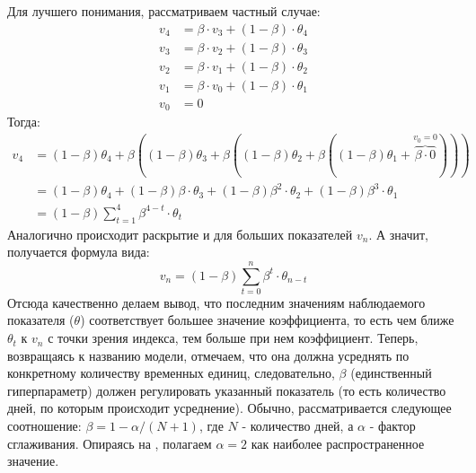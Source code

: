 			Для лучшего понимания, рассматриваем частный случае:
			\begin{equation}
				\begin{split}
					v_4 & = \beta \cdot v_3 + (1 - \beta) \cdot \theta_4\\
					v_3 & = \beta \cdot v_2 + (1 - \beta) \cdot \theta_3\\
					v_2 & = \beta \cdot v_1 + (1 - \beta) \cdot \theta_2\\
					v_1 & = \beta \cdot v_0 + (1 - \beta) \cdot \theta_1\\
					v_0 & = 0
				\end{split}
			\end{equation}
			Тогда:
			\begin{equation}
				\begin{split}
					v_4 & =  (1 - \beta) \theta_4 + \beta ((1 - \beta) \theta_3 + \beta ((1 - \beta) \theta_2 + \beta((1 - \beta) \theta_1 + \overbrace{\beta \cdot 0}^{v_0 = 0})))\\
					 & = (1 - \beta) \theta_4 + (1 - \beta) \beta \cdot \theta_3 + (1 - \beta) \beta^2 \cdot \theta_2 + (1 - \beta) \beta^3 \cdot \theta_1\\
					 & = (1 - \beta) \sum_{t = 1}^4 \beta^{4 - t} \cdot \theta_t
				\end{split}
			\end{equation}
			Аналогично происходит раскрытие и для больших показателей $v_n$. А значит, получается формула вида:
			\begin{equation}
				v_n = (1 - \beta) \sum_{t = 0}^n \beta^t \cdot \theta_{n - t}
			\end{equation}
			Отсюда качественно делаем вывод, что последним значениям наблюдаемого показателя ($\theta$) соответствует большее значение коэффициента, то есть чем ближе $\theta_{t}$ к $v_n$ с точки зрения индекса, тем больше при нем коэффициент. Теперь, возвращаясь к названию модели, отмечаем, что она должна усреднять по конкретному количеству временных единиц, следовательно, $\beta$ (единственный гиперпараметр) должен регулировать указанный показатель (то есть количество дней, по которым происходит усреднение). Обычно, рассматривается следующее соотношение: $\beta = 1 - \alpha / (N + 1)$, где $N$ - количество дней, а $\alpha$ - фактор сглаживания. Опираясь на \cite{ewma}, полагаем $\alpha = 2$ как наиболее распространенное значение.
			

